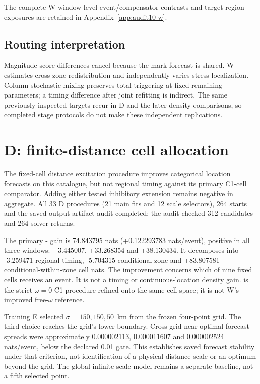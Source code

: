 The complete W window-level event/compensator contrasts and target-region exposures are retained in Appendix~\ref{app:audit10-w}.

\subsection{Routing interpretation}
Magnitude-score differences cancel because the mark forecast is shared. W estimates cross-zone redistribution and independently varies stress localization. Column-stochastic mixing preserves total triggering at fixed remaining parameters; a timing difference after joint refitting is indirect. The same previously inspected targets recur in D and the later density comparisons, so completed stage protocols do not make these independent replications.

\section{D: finite-distance cell allocation}

The fixed-cell distance excitation procedure improves categorical location forecasts on this catalogue, but not regional timing against its primary C1-cell comparator. Adding either tested inhibitory extension remains negative in aggregate. All 33 D procedures (21 main fits and 12 scale selectors), 264 starts and the saved-output artifact audit completed; the audit checked 312 candidates and 264 solver returns.

The primary \allowbreak{}-\allowbreak{} gain is 74.843795 nats (+0.122293783 nats/event), positive in all three windows: +3.445007, +33.268354 and +38.130434. It decomposes into -3.259471 regional timing, -5.704315 conditional-zone and +83.807581 conditional-within-zone cell nats. The improvement concerns which of nine fixed cells receives an event. It is not a timing or continuous-location density gain.  is the strict $\omega=0$ C1 procedure refined onto the same cell space; it is not W's improved free-$\omega$ reference.

Training E selected $\sigma=150, 150, 50$~km from the frozen four-point grid. The third choice reaches the grid's lower boundary. Cross-grid near-optimal forecast spreads were approximately 0.000002113, 0.000011607 and 0.000002524 nats/event, below the declared 0.01 gate. This establishes saved forecast stability under that criterion, not identification of a physical distance scale or an optimum beyond the grid. The global infinite-scale model remains a separate baseline, not a fifth selected point.

